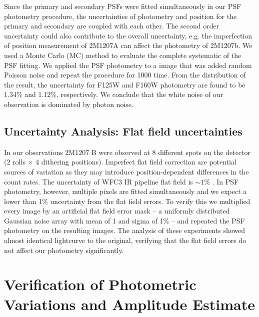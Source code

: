 \documentclass[apj]{emulateapj}
\begin{document}
Since the primary and secondary PSFs were fitted simultaneously in our
PSF photometry procedure, the uncertainties of photometry and position
for the primary and secondary are coupled with each other. The second
order uncertainty could also contribute to the overall uncertainty,
e.g. the imperfection of position measurement of 2M1207A can affect
the photometry of 2M1207b. We used a Monte Carlo (MC) method to evaluate the complete systematic of the
PSF fitting. We applied the PSF photometry to a image that
was added random Poisson noise and repeat the procedure for 1000
time. From the distribution of the result, the uncertainty for F125W
and F160W photometry are found to be 1.34\% and 1.12\%,
respectively. We conclude that the white noise of our observation is
dominated by photon noise. 

\subsection{Uncertainty Analysis: Flat field uncertainties}
In our observations 2M1207 B were observed at 8 different spots
on the detector (2 rolls $\times$ 4 dithering
positions). Imperfect flat field correction are potential sources of variation as they may introduce position-dependent differences in the count rates. The uncertainty of WFC3 IR pipeline flat field
is $\sim 1\%$ \citep{dressel2012wide}. 
In PSF photometry, however, multiple pixels are fitted simultaneously and we expect a lower than 1\% uncertainty from the flat field errors. To verify this we multiplied
every image by an artificial flat field error mask  -- a uniformly distributed Gaussian noise array with mean of 1 and sigma of 1\% -- and repeated the PSF photometry on the resulting images. 
The analysis of these experiments showed almost identical lightcurve to the original, verifying that the flat field errors do not affect our photometry significantly.


\section{Verification of Photometric Variations and Amplitude Estimate}
\end{document}

